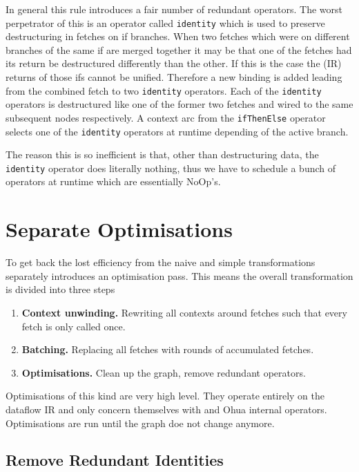 In general this rule introduces a fair number of redundant operators.
The worst perpetrator of this is an operator called \texttt{identity} which is used to preserve destructuring in fetches on if branches.
When two fetches which were on different branches of the same if are merged together it may be that one of the fetches had its return be destructured differently than the other.
If this is the case the (IR) returns of those ifs cannot be unified.
Therefore a new binding is added leading from the combined fetch to two \texttt{identity} operators.
Each of the \texttt{identity} operators is destructured like one of the former two fetches and wired to the same subsequent nodes respectively.
A context arc from the \texttt{ifThenElse} operator selects one of the \texttt{identity} operators at runtime depending of the active branch.

The reason this is so inefficient is that, other than destructuring data, the \texttt{identity} operator does literally nothing, thus we have to schedule a bunch of operators at runtime which are essentially NoOp's.

\section{Separate Optimisations}

To get back the lost efficiency from the naive and simple transformations \yauhau{} separately introduces an optimisation pass.
This means the overall transformation is divided into three steps

\begin{enumerate}
    \item \textbf{Context unwinding.} Rewriting all contexts around fetches such that every fetch is only called once.
    \item \textbf{Batching.} Replacing all fetches with rounds of accumulated fetches.
    \item \textbf{Optimisations.} Clean up the graph, remove redundant operators.
\end{enumerate}

Optimisations of this kind are very high level.
They operate entirely on the dataflow IR and only concern themselves with \yauhau{} and Ohua internal operators.
Optimisations are run until the graph doe not change anymore.


\subsection{Remove Redundant Identities}


